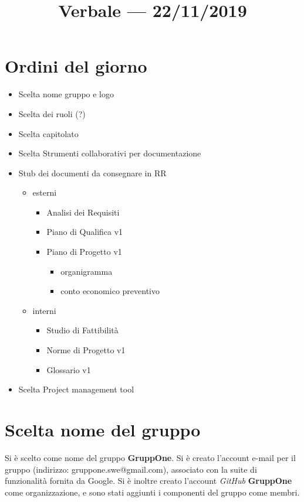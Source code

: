 \documentclass{article}
\title{Verbale --- 22/11/2019}
\begin{document}


\section{Ordini del giorno}%
\label{sec:ordini_del_giorno}

\begin{itemize}
  \item Scelta nome gruppo e logo
  \item Scelta dei ruoli (?)
  \item Scelta capitolato
  \item Scelta Strumenti collaborativi per documentazione
  \item Stub dei documenti da consegnare in RR
        \begin{itemize}
          \item esterni
                \begin{itemize}
                  \item Analisi dei Requisiti
                  \item Piano di Qualifica v1
                  \item Piano di Progetto v1
                        \begin{itemize}
                          \item organigramma
                          \item conto economico preventivo
                        \end{itemize}
                \end{itemize}
          \item interni
                \begin{itemize}
                  \item Studio di Fattibilità
                  \item Norme di Progetto v1
                  \item Glossario v1
                \end{itemize}
        \end{itemize}
  \item Scelta Project management tool
\end{itemize}

\section{Scelta nome del gruppo}%
\label{sec:scelta_nome_del_gruppo}
Si è scelto come nome del gruppo \textbf{GruppOne}. Si è creato l'account e-mail per il gruppo (indirizzo: gruppone.swe@gmail.com), associato con la suite di funzionalità fornita da Google.
Si è inoltre creato l'account \textit{GitHub} \textbf{GruppOne} come organizzazione, e sono stati aggiunti i componenti del gruppo come membri.
\end{document}
